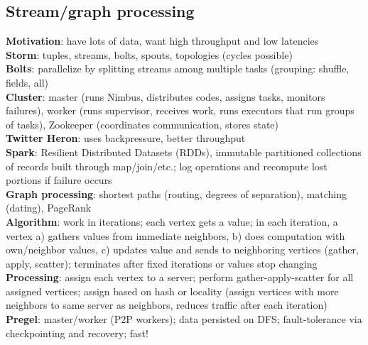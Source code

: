 \documentclass{article}
\begin{document}
\begin{multicols*}{3}
\section{Stream/graph processing}
\textbf{Motivation}: have lots of data, want high throughput and low latencies \\
\textbf{Storm}: tuples, streams, bolts, spouts, topologies (cycles possible) \\
\textbf{Bolts}: parallelize by splitting streams among multiple tasks (grouping: shuffle, fields, all) \\
\textbf{Cluster}: master (runs Nimbus, distributes codes, assigns tasks, monitors failures), worker (runs supervisor, receives work, runs executors that run groups of tasks), Zookeeper (coordinates communication, stores state) \\
\textbf{Twitter Heron}: uses backpressure, better throughput \\
\textbf{Spark}: Resilient Distributed Datasets (RDDs), immutable partitioned collections of records built through map/join/etc.; log operations and recompute lost portions if failure occurs \\
\textbf{Graph processing}: shortest paths (routing, degrees of separation), matching (dating), PageRank \\
\textbf{Algorithm}: work in iterations; each vertex gets a value; in each iteration, a vertex a) gathers values from immediate neighbors, b) does computation with own/neighbor values, c) updates value and sends to neighboring vertices (gather, apply, scatter); terminates after fixed iterations or values stop changing \\
\textbf{Processing}: assign each vertex to a server; perform gather-apply-scatter for all assigned vertices; assign based on hash or locality (assign vertices with more neighbors to same server as neighbors, reduces traffic after each iteration) \\
\textbf{Pregel}: master/worker (P2P workers); data persisted on DFS; fault-tolerance via checkpointing and recovery; fast!


\end{multicols*}
\end{document}
